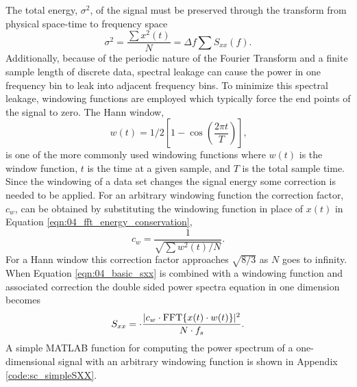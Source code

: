 The total energy, $\sigma^2$, of the signal must be preserved through the transform from physical space-time to frequency space
\begin{equation}
  \sigma^2 = \frac{\sum x^2(t)}{N} = \Delta f\sum S_{xx}(f) \textrm{.}
  \label{eqn:04_fft_energy_conservation}
\end{equation}
Additionally, because of the periodic nature of the Fourier Transform and a finite sample length of discrete data, spectral leakage can cause the power in one frequency bin to leak into adjacent frequency bins.
To minimize this spectral leakage, windowing functions are employed which typically force the end points of the signal to zero.
The Hann window,
\begin{equation}
 w(t) = 1/2\left[1-\cos\left(\frac{2\pi t}{T}\right)\right] \textrm{,}
 \label{eqn:04_hann_window}
\end{equation}
is one of the more commonly used windowing functions where $w(t)$ is the window function, $t$ is the time at a given sample, and $T$ is the total sample time.
Since the windowing of a data set changes the signal energy some correction is needed to be applied.
For an arbitrary windowing function the correction factor, $c_w$, can be obtained by substituting the windowing function in place of $x(t)$ in Equation \ref{eqn:04_fft_energy_conservation},
\begin{equation}
 c_w = \frac{1}{\sqrt{\sum w^2(t)/N}} \textrm{.}
 \label{eqn:04_window_correction}
\end{equation}
For a Hann window this correction factor approaches $\sqrt{8/3}$ as $N$ goes to infinity.
When Equation \ref{eqn:04_basic_sxx} is combined with a windowing function and associated correction the double sided power spectra equation in one dimension becomes
\begin{equation}
 S_{xx} = \cdot\frac{|c_w\cdot\operatorname{FFT}\{x(t)\cdot w(t)\}|^2}{N\cdot f_{s}} \textrm{.}
 \label{eqn:04_windowed_sxx}
\end{equation}
A simple MATLAB function for computing the power spectrum of a one-dimensional signal with an arbitrary windowing function is shown in Appendix \ref{code:sc_simpleSXX}.

